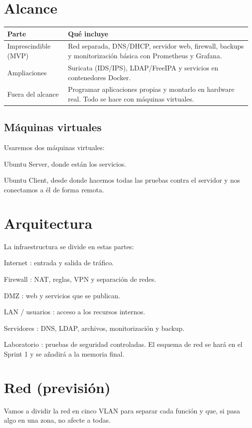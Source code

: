 \documentclass[11pt,a4paper]{report}
\begin{document}
\chapter{Alcance}
\begin{tabularx}{\textwidth}{|p{3.2cm}|X|}
\hline
\textbf{Parte} & \textbf{Qué incluye} \\ \hline
Imprescindible (MVP) & Red separada, DNS/DHCP, servidor web, firewall, backups y monitorización básica con Prometheus y Grafana. \\ \hline
Ampliaciones & Suricata (IDS/IPS), LDAP/FreeIPA y servicios en contenedores Docker. \\ \hline
Fuera del alcance & Programar aplicaciones propias y montarlo en hardware real. Todo se hace con máquinas virtuales. \\ \hline
\end{tabularx}
\section{Máquinas virtuales}
 Usaremos dos máquinas virtuales: 
\par\noindent\textbullet\quad  Ubuntu Server, donde están los servicios. 
\par\noindent\textbullet\quad  Ubuntu Client, desde donde hacemos todas las pruebas contra el servidor y nos conectamos a él de forma remota.

\chapter{Arquitectura}
La infraestructura se divide en estas partes: 
\par\noindent\textbullet\quad  Internet : entrada y salida de tráfico. 
\par\noindent\textbullet\quad  Firewall : NAT, reglas, VPN y separación de redes. 
\par\noindent\textbullet\quad  DMZ : web y servicios que se publican. 
\par\noindent\textbullet\quad  LAN / usuarios : acceso a los recursos internos. 
\par\noindent\textbullet\quad  Servidores : DNS, LDAP, archivos, monitorización y backup. 
\par\noindent\textbullet\quad  Laboratorio : pruebas de seguridad controladas. El esquema de red se hará en el Sprint 1 y se añadirá a la memoria final.

\chapter{Red (previsión)}
Vamos a dividir la red en cinco VLAN para separar cada función y que, si pasa algo en una zona, no afecte a todas. 
\end{document}
